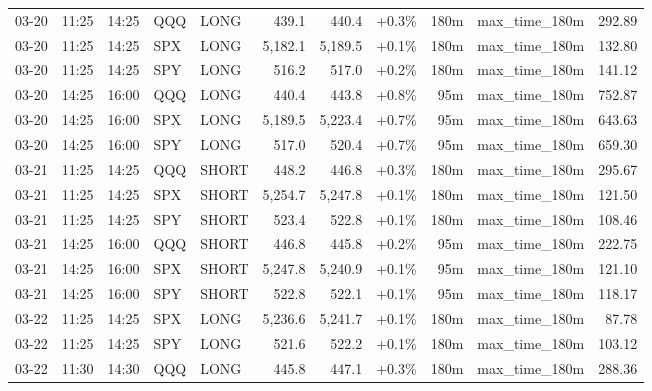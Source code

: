 \documentclass[11pt,a4paper,twoside]{article}
\begin{document}
\begin{center}
\begin{longtable}{>{\color{txtmain}}l l l l l r r r r >{\color{txtmain}}l r}
03-20 & 11:25 & 14:25 & QQQ & LONG & 439.1 & 440.4 & \textcolor{wingreen}{+0.3\%} & 180m & max\_time\_180m & \textcolor{wingreen}{292.89} \\
03-20 & 11:25 & 14:25 & SPX & LONG & 5,182.1 & 5,189.5 & \textcolor{wingreen}{+0.1\%} & 180m & max\_time\_180m & \textcolor{wingreen}{132.80} \\
03-20 & 11:25 & 14:25 & SPY & LONG & 516.2 & 517.0 & \textcolor{wingreen}{+0.2\%} & 180m & max\_time\_180m & \textcolor{wingreen}{141.12} \\
03-20 & 14:25 & 16:00 & QQQ & LONG & 440.4 & 443.8 & \textcolor{wingreen}{+0.8\%} & 95m & max\_time\_180m & \textcolor{wingreen}{752.87} \\
03-20 & 14:25 & 16:00 & SPX & LONG & 5,189.5 & 5,223.4 & \textcolor{wingreen}{+0.7\%} & 95m & max\_time\_180m & \textcolor{wingreen}{643.63} \\
03-20 & 14:25 & 16:00 & SPY & LONG & 517.0 & 520.4 & \textcolor{wingreen}{+0.7\%} & 95m & max\_time\_180m & \textcolor{wingreen}{659.30} \\
03-21 & 11:25 & 14:25 & QQQ & SHORT & 448.2 & 446.8 & \textcolor{wingreen}{+0.3\%} & 180m & max\_time\_180m & \textcolor{wingreen}{295.67} \\
03-21 & 11:25 & 14:25 & SPX & SHORT & 5,254.7 & 5,247.8 & \textcolor{wingreen}{+0.1\%} & 180m & max\_time\_180m & \textcolor{wingreen}{121.50} \\
03-21 & 11:25 & 14:25 & SPY & SHORT & 523.4 & 522.8 & \textcolor{wingreen}{+0.1\%} & 180m & max\_time\_180m & \textcolor{wingreen}{108.46} \\
03-21 & 14:25 & 16:00 & QQQ & SHORT & 446.8 & 445.8 & \textcolor{wingreen}{+0.2\%} & 95m & max\_time\_180m & \textcolor{wingreen}{222.75} \\
03-21 & 14:25 & 16:00 & SPX & SHORT & 5,247.8 & 5,240.9 & \textcolor{wingreen}{+0.1\%} & 95m & max\_time\_180m & \textcolor{wingreen}{121.10} \\
03-21 & 14:25 & 16:00 & SPY & SHORT & 522.8 & 522.1 & \textcolor{wingreen}{+0.1\%} & 95m & max\_time\_180m & \textcolor{wingreen}{118.17} \\
03-22 & 11:25 & 14:25 & SPX & LONG & 5,236.6 & 5,241.7 & \textcolor{wingreen}{+0.1\%} & 180m & max\_time\_180m & \textcolor{wingreen}{87.78} \\
03-22 & 11:25 & 14:25 & SPY & LONG & 521.6 & 522.2 & \textcolor{wingreen}{+0.1\%} & 180m & max\_time\_180m & \textcolor{wingreen}{103.12} \\
03-22 & 11:30 & 14:30 & QQQ & LONG & 445.8 & 447.1 & \textcolor{wingreen}{+0.3\%} & 180m & max\_time\_180m & \textcolor{wingreen}{288.36} \\

\end{longtable}
\end{center}
\end{document}
